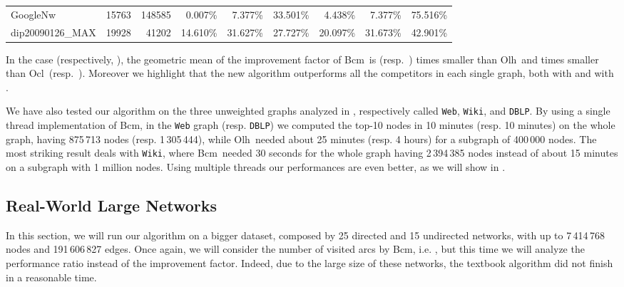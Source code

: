 \documentclass{acm_proc_article-sp}
\newcommand{\deltabfs}{{\sc Olh}}
\newcommand{\sampl}{{\sc Ocl}}
\newcommand{\newalg}{{\sc Bcm}}
\begin{document}
\begin{table*}[tb]
\begin{scriptsize}
\begin{tabular}{|l|r|r|r|r|r|r|r|r|}
GoogleNw               &     15763     &     148585     &     0.007\%     &     7.377\%     &     33.501\%     &     4.438\%     &     7.377\%     &     75.516\%\\ 
 dip20090126\_MAX        &     19928     &     41202     &     14.610\%     &     31.627\%     &     27.727\%     &     20.097\%     &     31.673\%     &     42.901\% \\
 \hline
\end{tabular}
\end{scriptsize}
\end{table*}





In the case  (respectively, ), the geometric mean of the improvement factor of \newalg\ is  (resp.~) times smaller than \deltabfs\ and  times smaller than \sampl\ (resp.~). Moreover we highlight that the new algorithm outperforms all the competitors in each single graph, both with  and with .

We have also tested our algorithm on the three unweighted graphs analyzed in \cite{Olsen2014}, respectively called \texttt{Web}, \texttt{Wiki}, and \texttt{DBLP}.  
By using a single thread implementation of \newalg, in the \texttt{Web} graph (resp. \texttt{DBLP}) we computed the top-10 nodes in 10 minutes (resp. 10 minutes) on the whole graph, having 875\,713 nodes (resp. 1\,305\,444), while \deltabfs\ needed about 25 minutes (resp. 4 hours) for a subgraph of 400\,000 nodes. The most striking result deals with \texttt{Wiki}, where \newalg\ needed 30 seconds for the whole graph having 2\,394\,385 nodes instead of about 15 minutes on a subgraph with 1 million nodes. Using multiple threads our  performances are even better, as we will show in .


\subsection{Real-World Large Networks} \label{sec:expbig}

In this section, we will run our algorithm on a bigger dataset, composed by 25 directed and 15 undirected networks, with up to 7\,414\,768 nodes and 191\,606\,827 edges.
Once again, we will consider the number of visited arcs by \newalg, i.e. , but this time we will analyze the performance ratio  instead of the improvement factor. Indeed, due to the large size of these networks, the textbook algorithm did not finish in a reasonable time.
\end{document}
